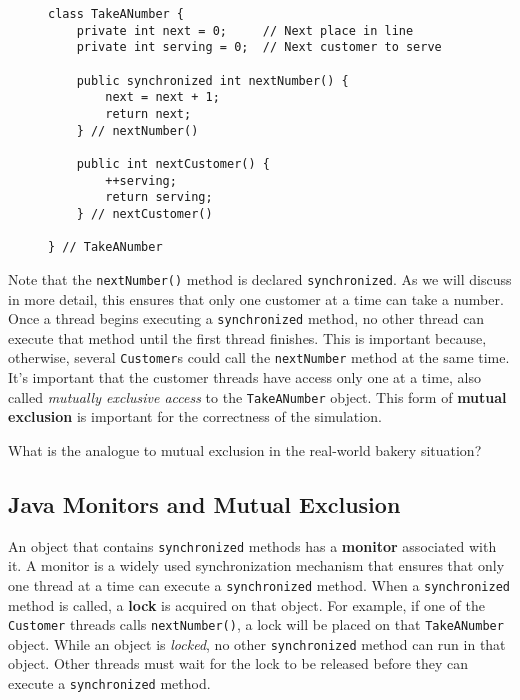 \begin{figure}[h]
\jjjprogstart
\begin{jjjlisting}
\begin{lstlisting}
class TakeANumber {
    private int next = 0;     // Next place in line
    private int serving = 0;  // Next customer to serve

    public synchronized int nextNumber() {
        next = next + 1;
        return next;
    } // nextNumber()

    public int nextCustomer() {
        ++serving;
        return serving;
    } // nextCustomer()

} // TakeANumber
\end{lstlisting}
\end{jjjlisting}
\end{figure}

Note that the {\tt nextNumber()} method is declared
{\tt synchronized}.  As we will discuss in more detail, this ensures that
only one customer at a time can take a number.   Once a thread begins
executing a {\tt synchronized} method, no other thread can execute that
method until the first thread finishes.
 This is important because,
otherwise, several {\tt Customer}s could call the {\tt nextNumber}
method at the same time.  It's important that the customer threads
have access only one at a time, also called {\em mutually exclusive
access} to the {\tt TakeANumber} object.  This form of {\bf mutual
exclusion} is important for the correctness of
the simulation.

\begin{SSTUDY}

\item What is the analogue to mutual
exclusion in the real-world bakery situation?
\end{SSTUDY}

\subsection{Java Monitors and Mutual Exclusion}
\noindent An object that contains {\tt synchronized} methods has a {\bf monitor}
associated with it.  A monitor is a widely used synchronization
mechanism that ensures that only one thread at a time can execute a
{\tt synchronized} method.   When a {\tt synchronized} method is
called, a {\bf lock} is acquired on that object.  For example, if one
of the {\tt Customer} threads calls {\tt nextNumber()}, a lock will be
placed on that {\tt TakeANumber} object.   While an object is {\it
locked}, no other {\tt synchronized} method can run in that
object.  Other threads must wait for the lock to be released before
they can execute a {\tt synchronized} method.

